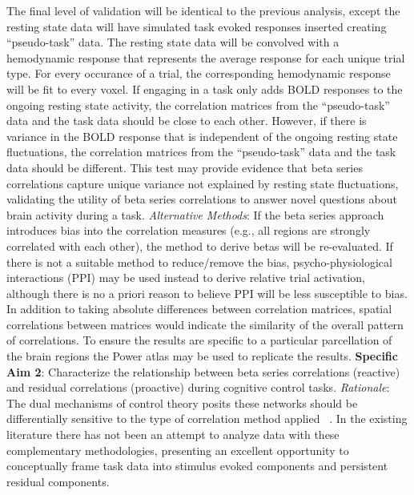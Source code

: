 \documentclass[phd,appendix,figures]{uithesis}
\begin{document}
The final level of validation will be identical to the previous analysis, except the resting state data will have simulated task evoked responses inserted creating “pseudo-task” data.
The resting state data will be convolved with a hemodynamic response that represents the average response for each unique trial type.
For every occurance of a trial, the corresponding hemodynamic response will be fit to every voxel.
If engaging in a task only adds BOLD responses to the ongoing resting state activity, the correlation matrices from the “pseudo-task” data and the task data should be close to each other.
However, if there is variance in the BOLD response that is independent of the ongoing resting state fluctuations, the correlation matrices from the “pseudo-task” data and the task data should be different.
This test may provide evidence that beta series correlations capture unique variance not explained by resting state fluctuations, validating the utility of beta series correlations to answer novel questions about brain activity during a task.
\newline
\newline
\textit{Alternative Methods}: If the beta series approach introduces bias into the correlation measures (e.g., all regions are strongly correlated with each other), the method to derive betas will be re-evaluated.
If there is not a suitable method to reduce/remove the bias, psycho-physiological interactions (PPI) may be used instead to derive relative trial activation, although there is no a priori reason to believe PPI will be less susceptible to bias.
In addition to taking absolute differences between correlation matrices, spatial correlations between matrices would indicate the similarity of the overall pattern of correlations.
To ensure the results are specific to a particular parcellation of the brain regions the Power atlas may be used to replicate the results.
\newline
\newline
\textbf{Specific Aim 2}: Characterize the relationship between beta series correlations (reactive) and residual correlations (proactive) during cognitive control tasks.
\newline
\newline
\textit{Rationale}: The dual mechanisms of control theory posits these networks should be differentially sensitive to the type of correlation method applied ~\citep{Dosenbach2007,Braver2006}. 
In the existing literature there has not been an attempt to analyze data with these complementary methodologies, presenting an excellent opportunity to conceptually frame task data into stimulus evoked components and persistent residual components.
\end{document}
